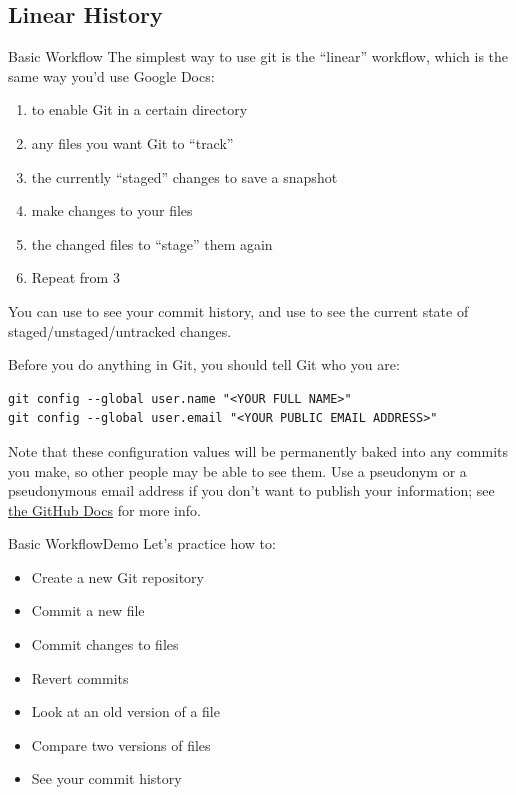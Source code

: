\subsection{Linear History}
\begin{frame}{Basic Workflow}
  \vspace{-0.5em}
  The simplest way to use git is the \enquote{linear} workflow, which is the
  same way you'd use Google Docs:
  \pause
  \begin{enumerate}
    \item {} to enable Git in a certain directory 
      \pause
    \item {} any files you want Git to \enquote{track}
      \pause
    \item {} the currently \enquote{staged} changes to save a
      snapshot
      \pause
    \item make changes to your files
      \pause
    \item {} the changed files to \enquote{stage} them again
      \pause
    \item Repeat from 3
  \end{enumerate}

  You can use  to see your commit history, and use  to see the current state of staged/unstaged/untracked changes.
\end{frame}

Before you do anything in Git, you should tell Git who you are:
\begin{verbatim}
git config --global user.name "<YOUR FULL NAME>"
git config --global user.email "<YOUR PUBLIC EMAIL ADDRESS>"
\end{verbatim}

Note that these configuration values will be permanently baked into any commits
you make, so other people may be able to see them.  Use a pseudonym or a
pseudonymous email address if you don't want to publish your information; see
\href{https://docs.github.com/en/account-and-profile/setting-up-and-managing-your-personal-account-on-github/managing-email-preferences/setting-your-commit-email-address}{the
GitHub Docs} for more info.

\begin{frame}{Basic Workflow}{Demo}
  Let's practice how to:
  \begin{itemize}
    \item Create a new Git repository
    \item Commit a new file
    \item Commit changes to files
    \item Revert commits
    \item Look at an old version of a file
    \item Compare two versions of files
    \item See your commit history
  \end{itemize}
\end{frame}

